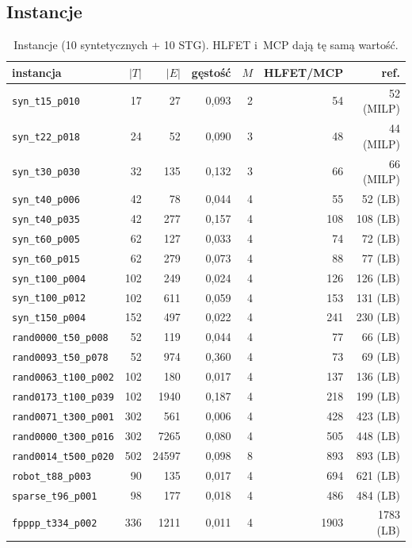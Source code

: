 \documentclass[12pt,a4paper]{article}
\begin{document}
\subsection{Instancje}
\begin{table}[H]
\centering\small\setlength{\tabcolsep}{5pt}
\begin{tabular}{lrrrrrr}
\toprule
instancja & $|T|$ & $|E|$ & gęstość & $M$ & HLFET/MCP & ref. \\
\midrule
\texttt{syn\_t15\_p010}      &  17 &    27 & 0{,}093 & 2 &   54 &   52 (MILP) \\
\texttt{syn\_t22\_p018}      &  24 &    52 & 0{,}090 & 3 &   48 &   44 (MILP) \\
\texttt{syn\_t30\_p030}      &  32 &   135 & 0{,}132 & 3 &   66 &   66 (MILP) \\
\texttt{syn\_t40\_p006}      &  42 &    78 & 0{,}044 & 4 &   55 &   52 (LB) \\
\texttt{syn\_t40\_p035}      &  42 &   277 & 0{,}157 & 4 &  108 &  108 (LB) \\
\texttt{syn\_t60\_p005}      &  62 &   127 & 0{,}033 & 4 &   74 &   72 (LB) \\
\texttt{syn\_t60\_p015}      &  62 &   279 & 0{,}073 & 4 &   88 &   77 (LB) \\
\texttt{syn\_t100\_p004}     & 102 &   249 & 0{,}024 & 4 &  126 &  126 (LB) \\
\texttt{syn\_t100\_p012}     & 102 &   611 & 0{,}059 & 4 &  153 &  131 (LB) \\
\texttt{syn\_t150\_p004}     & 152 &   497 & 0{,}022 & 4 &  241 &  230 (LB) \\
\midrule
\texttt{rand0000\_t50\_p008} &  52 &   119 & 0{,}044 & 4 &   77 &   66 (LB) \\
\texttt{rand0093\_t50\_p078} &  52 &   974 & 0{,}360 & 4 &   73 &   69 (LB) \\
\texttt{rand0063\_t100\_p002}& 102 &   180 & 0{,}017 & 4 &  137 &  136 (LB) \\
\texttt{rand0173\_t100\_p039}& 102 &  1940 & 0{,}187 & 4 &  218 &  199 (LB) \\
\texttt{rand0071\_t300\_p001}& 302 &   561 & 0{,}006 & 4 &  428 &  423 (LB) \\
\texttt{rand0000\_t300\_p016}& 302 &  7265 & 0{,}080 & 4 &  505 &  448 (LB) \\
\texttt{rand0014\_t500\_p020}& 502 & 24597 & 0{,}098 & 8 &  893 &  893 (LB) \\
\texttt{robot\_t88\_p003}    &  90 &   135 & 0{,}017 & 4 &  694 &  621 (LB) \\
\texttt{sparse\_t96\_p001}   &  98 &   177 & 0{,}018 & 4 &  486 &  484 (LB) \\
\texttt{fpppp\_t334\_p002}   & 336 &  1211 & 0{,}011 & 4 & 1903 & 1783 (LB) \\
\bottomrule
\end{tabular}
\caption{Instancje (10 syntetycznych + 10 STG). HLFET i~MCP dają tę samą wartość.}
\label{tab:instances}
\end{table}
\end{document}

